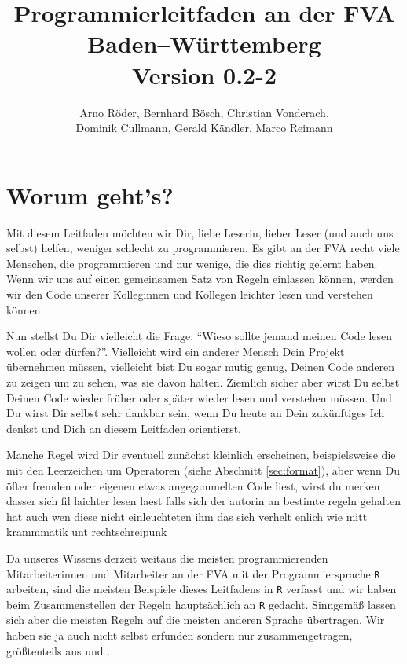 \documentclass[twoside]{scrartcl}
\providecommand{\R}{\texttt{R}}
\begin{document}
\title{Programmierleitfaden an der FVA Baden--W\"u{}rttemberg\\
\vspace{1cm}
\normalsize{Version 0.2-2}
}
\author{Arno R\"oder, Bernhard B\"o{}sch, Christian Vonderach,\\
Dominik Cullmann, Gerald K\"a{}ndler, Marco Reimann}
\maketitle
\tableofcontents
\thispagestyle{fancy}
\section{Worum geht's?}
Mit diesem Leitfaden m\"o{}chten wir Dir, liebe Leserin, lieber Leser (und auch
uns selbst) helfen, weniger schlecht zu programmieren.
Es gibt an der FVA recht viele Menschen, die programmieren und nur wenige, die
dies richtig gelernt haben. Wenn wir uns auf einen gemeinsamen Satz von Regeln
einlassen k\"o{}nnen, werden wir den Code unserer Kolleginnen und Kollegen
leichter lesen und verstehen k\"o{}nnen.

Nun stellst Du Dir vielleicht die Frage: "`Wieso sollte jemand meinen Code lesen
wollen oder d\"u{}rfen?"'. Vielleicht wird ein anderer Mensch Dein Projekt
\"u{}bernehmen m\"u{}ssen, vielleicht bist Du sogar mutig genug, Deinen Code
anderen zu zeigen um zu sehen, was sie davon halten. Ziemlich sicher aber wirst
Du selbst Deinen Code wieder fr\"u{}her oder sp\"a{}ter wieder lesen und 
verstehen m\"u{}ssen. Und Du wirst Dir selbst sehr dankbar sein, wenn Du heute 
an Dein zuk\"u{}nftiges Ich denkst und Dich an diesem Leitfaden orientierst.

Manche Regel wird Dir eventuell zun\"a{}chst kleinlich erscheinen,
beispielsweise die mit den Leerzeichen  um  Operatoren (siehe Abschnitt
\ref{sec:format}), aber wenn Du \"o{}fter fremden oder eigenen etwas
angegammelten Code liest, wirst
du merken dasser sich fil laichter lesen laest falls sich der autorin an
bestimte regeln gehalten hat auch wen diese nicht einleuchteten ihm das
sich verhelt enlich wie mitt krammmatik unt rechtschreipunk

Da unseres Wissens derzeit weitaus die meisten programmierenden Mitarbeiterinnen
und Mitarbeiter an der FVA mit der Programmiersprache \R{} arbeiten, sind die
meisten Beispiele dieses Leitfadens in \R{} verfasst und wir haben beim
Zusammenstellen der Regeln haupts\"a{}chlich an \R{} gedacht.
Sinngem\"a{}\ss{} lassen sich aber die meisten Regeln auf die meisten
anderen Sprache \"u{}bertragen. Wir haben sie ja auch nicht selbst erfunden
sondern nur zusammengetragen, gr\"o{}\ss{}tenteils aus \cite{cc} und \cite{wsp}.
\end{document}
